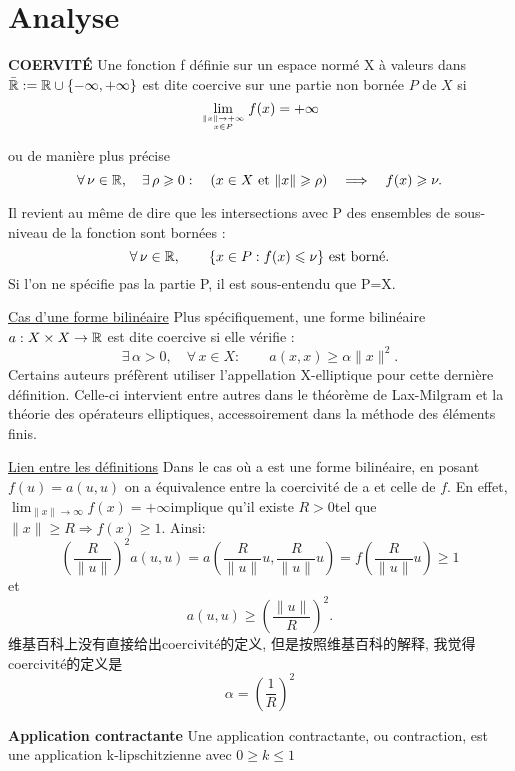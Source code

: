 \chapter{Analyse}

\textbf{COERVIT\'E}
Une fonction f d\'efinie sur un espace norm\'e X \`a valeurs dans $ \bar{\mathbb{R}}:=\mathbb{R}\cup\{-\infty,+\infty\}$ est dite coercive sur une partie non born\'ee $ P$ de $X$ si
$$ \lim_{\mytop{\| x\| \to +\infty}{x\in P}}f(x)=+\infty $$

ou de mani\`ere plus pr\'ecise
$$
\forall\,\nu\in\mathbb{R},\quad \exists\,\rho\geqslant0:\quad (x\in X ~\mbox{et}~ \|x\|\geqslant\rho) \quad\Longrightarrow\quad f(x)\geqslant\nu.
$$

Il revient au m\^eme de dire que les intersections avec P des ensembles de sous-niveau de la fonction sont born\'ees :
$$
\forall\,\nu\in\mathbb{R},\qquad\{x\in P: f(x)\leqslant\nu\}~\mbox{est born\'e.}
$$
Si l'on ne sp\'ecifie pas la partie P, il est sous-entendu que P=X.

\underline{Cas d'une forme bilin\'eaire} \newline
Plus sp\'ecifiquement, une forme bilin\'eaire $a:X\times X\to\mathbb{R}$ est dite coercive si elle v\'erifie :
$$
\exists\,\alpha>0,\quad\forall\,x\in X:\qquad a(x,x) \geqslant \alpha\|x\|^2.
$$
Certains auteurs pr\'ef\`erent utiliser l'appellation X-elliptique pour cette derni\`ere d\'efinition. Celle-ci intervient entre autres dans le th\'eor\`eme de Lax-Milgram et la th\'eorie des op\'erateurs elliptiques, accessoirement dans la m\'ethode des \'el\'ements finis.

\underline{Lien entre les d\'efinitions}\newline
Dans le cas où a est une forme bilin\'eaire, en posant $f(u)=a(u,u)$ on a \'equivalence entre la coercivit\'e de a et celle de $f$. En effet, $\scriptstyle\lim_{\| x\|\to\infty}f(x)=+\infty $implique qu'il existe $R>0 $tel que $\scriptstyle\|x\|\geqslant R\Rightarrow f(x)\geqslant 1$. Ainsi:
$$
\left(\frac{R}{\|u\|}\right)^2a(u,u)=a\left(\frac{R}{\|u\|}u,\frac{R}{\|u\|}u\right)=f\left(\frac{R}{\|u\|}u\right)\geqslant 1
$$
et
$$
a(u,u)\geqslant\left(\frac{\|u\|}{R}\right)^2.
$$
维基百科上没有直接给出coercivit\'e的定义, 但是按照维基百科的解释, 我觉得coercivit\'e的定义是
$$
 \alpha=\left(\frac{1}{R}\right)^2
$$

\bigskip
\textbf{Application contractante}\newline
Une application contractante, ou contraction, est une application k-lipschitzienne avec $0 \geq k \le 1$
\bigskip


